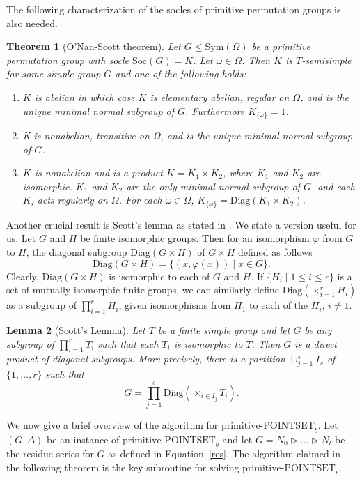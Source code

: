 \documentclass[11pt]{article}
\newtheorem{theorem}{Theorem}[section]
\newtheorem{lemma}[theorem]{Lemma}
\newcommand{\prpsb}[1]{\ensuremath{\textrm{primitive-POINTSET}_{#1}}}
\newcommand{\Sym}[1]{\ensuremath{\mathrm{Sym}\left({#1}\right)}}
\newcommand{\Soc}[1]{\ensuremath{\mathrm{Soc}\left(#1\right)}}
\newcommand{\Diag}[1]{\ensuremath{\mathrm{Diag}\left({#1}\right)}}
\begin{document}
The following characterization of the socles of primitive permutation
groups is also needed.

\begin{theorem}[O'Nan-Scott theorem]\label{onan}
  Let $G \leq \Sym{\Omega}$ be a primitive permutation group with
  socle $\Soc{G} = K$. Let $\omega \in \Omega$. Then $K$ is
  $T$-semisimple for some simple group $G$ and one of the following
  holds:
  \begin{enumerate}
  \item[(i)] $K$ is abelian in which case $K$ is elementary abelian,
    regular on $\Omega$, and is the unique minimal normal subgroup of
    $G$. Furthermore $K_{\{\omega\}} = 1$.
  \item[(ii)] K is nonabelian, transitive on $\Omega$, and is the unique
    minimal normal subgroup of $G$.
  \item[(iii)] $K$ is nonabelian and is a product $K = K_1 \times
    K_2$, where $K_1$ and $K_2$ are isomorphic. $K_1$ and $K_2$ are
    the only minimal normal subgroup of $G$, and each $K_i$ acts
    regularly on $\Omega$. For each $\omega\in\Omega$, $K_{\{\omega\}}
    =\Diag{K_1\times K_2}$.
  \end{enumerate}
 \end{theorem}
 
Another crucial result is Scott's lemma as stated in \cite{luks}. We
state a version useful for us. Let $G$ and $H$ be finite isomorphic
groups. Then for an isomorphism $\varphi$ from $G$ to $H$, the
diagonal subgroup $\Diag{G\times H}$ of $G\times H$ defined as follows
\[
\Diag{G\times H}=\{(x,\varphi(x))\mid x\in G\}.
\]
Clearly, $\Diag{G\times H}$ is isomorphic to each of $G$ and $H$.  If
$\{H_i\mid 1\leq i\leq r\}$ is a set of mutually isomorphic finite
groups, we can similarly define $\Diag{\times_{i=1}^r H_i}$ as a
subgroup of $\prod_{i=1}^r H_i$, given isomorphisms from $H_1$ to each
of the $H_i$, $i\neq 1$.

\begin{lemma}[Scott's Lemma]\label{scott}
Let $T$ be a finite simple group and let $G$ be any subgroup of
$\prod_{i=1}^r T_i$ such that each $T_i$ is isomorphic to $T$.  Then
$G$ is a direct product of diagonal subgroups. More precisely, there
is a partition $\cup_{j=1}^s I_s$ of $\{1,\ldots,r\}$ such that
\[
G=\prod_{j=1}^s\Diag{\times_{i\in I_j}T_i}.
\]
\end{lemma}

We now give a brief overview of the algorithm for $\prpsb{b}$. Let
$(G,\Delta)$ be an instance of $\prpsb{b}$ and let $G = N_0 \rhd
\ldots \rhd N_l$ be the residue series for $G$ as defined in
Equation~\ref{res}. The algorithm claimed in the following
theorem is the key subroutine for solving $\prpsb{b}$.
\end{document}
